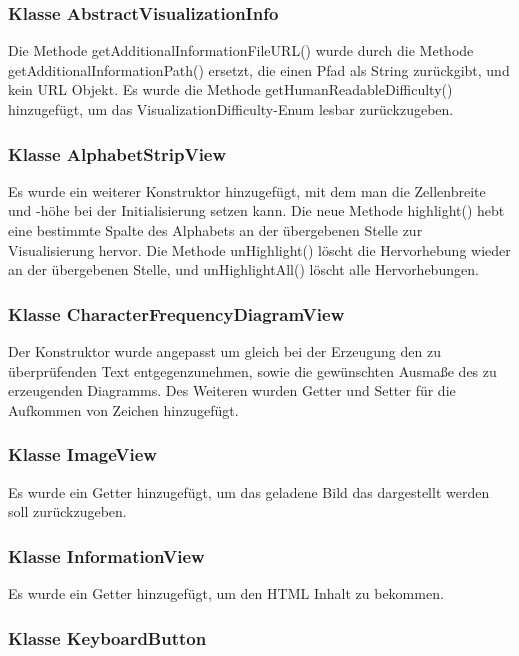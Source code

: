 \documentclass{article}
\begin{document}
	\subsubsection{Klasse AbstractVisualizationInfo}

	Die Methode getAdditionalInformationFileURL() wurde durch die Methode 
	getAdditionalInformationPath() ersetzt, die einen Pfad als String zurückgibt, und kein
	URL Objekt. Es wurde die Methode getHumanReadableDifficulty() hinzugefügt, um 
	das VisualizationDifficulty-Enum lesbar zurückzugeben.

	\subsubsection{Klasse AlphabetStripView}
	
	Es wurde ein weiterer Konstruktor hinzugefügt, mit dem man die Zellenbreite und -höhe
	bei der Initialisierung setzen kann. Die neue Methode highlight() hebt eine bestimmte
	Spalte des Alphabets an der übergebenen Stelle zur Visualisierung hervor. Die Methode 
	unHighlight() löscht die Hervorhebung wieder an der übergebenen Stelle, und unHighlightAll() 
	löscht alle Hervorhebungen.

	\subsubsection{Klasse CharacterFrequencyDiagramView}

	Der Konstruktor wurde angepasst um gleich bei der Erzeugung den zu überprüfenden Text
	entgegenzunehmen, sowie die gewünschten Ausmaße des zu erzeugenden Diagramms. Des Weiteren
	wurden Getter und Setter für die Aufkommen von Zeichen hinzugefügt.

	\subsubsection{Klasse ImageView}

	Es wurde ein Getter hinzugefügt, um das geladene Bild das dargestellt werden soll zurückzugeben.

	\subsubsection{Klasse InformationView}

	Es wurde ein Getter hinzugefügt, um den HTML Inhalt zu bekommen.

	\subsubsection{Klasse KeyboardButton}
\end{document}
